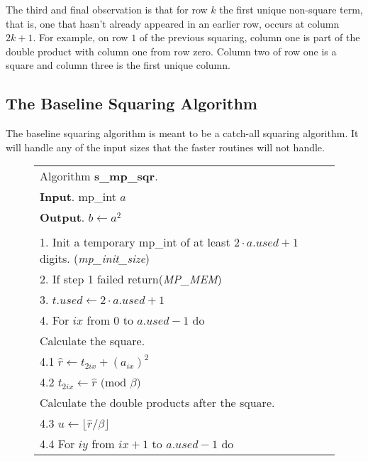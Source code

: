 \documentclass[b5paper]{book}
\begin{document}
The third and final observation is that for row $k$ the first unique non-square term, that is, one that hasn't already appeared in an earlier row, 
occurs at column $2k + 1$.  For example, on row $1$ of the previous squaring, column one is part of the double product with column one from row zero. 
Column two of row one is a square and column three is the first unique column.

\subsection{The Baseline Squaring Algorithm}
The baseline squaring algorithm is meant to be a catch-all squaring algorithm.  It will handle any of the input sizes that the faster routines
will not handle.  

\newpage\begin{figure}[!here]
\begin{small}
\begin{center}
\begin{tabular}{l}
\hline Algorithm \textbf{s\_mp\_sqr}. \\
\textbf{Input}.   mp\_int $a$ \\
\textbf{Output}.  $b \leftarrow a^2$ \\
\hline \\
1.  Init a temporary mp\_int of at least $2 \cdot a.used +1$ digits.  (\textit{mp\_init\_size}) \\
2.  If step 1 failed return(\textit{MP\_MEM}) \\
3.  $t.used \leftarrow 2 \cdot a.used + 1$ \\
4.  For $ix$ from 0 to $a.used - 1$ do \\
\hspace{3mm}Calculate the square. \\
\hspace{3mm}4.1  $\hat r \leftarrow t_{2ix} + \left (a_{ix} \right )^2$ \\
\hspace{3mm}4.2  $t_{2ix} \leftarrow \hat r \mbox{ (mod }\beta\mbox{)}$ \\
\hspace{3mm}Calculate the double products after the square. \\
\hspace{3mm}4.3  $u \leftarrow \lfloor \hat r / \beta \rfloor$ \\
\hspace{3mm}4.4  For $iy$ from $ix + 1$ to $a.used - 1$ do \\

\end{tabular}
\end{center}
\end{small}
\end{figure}
\end{document}
